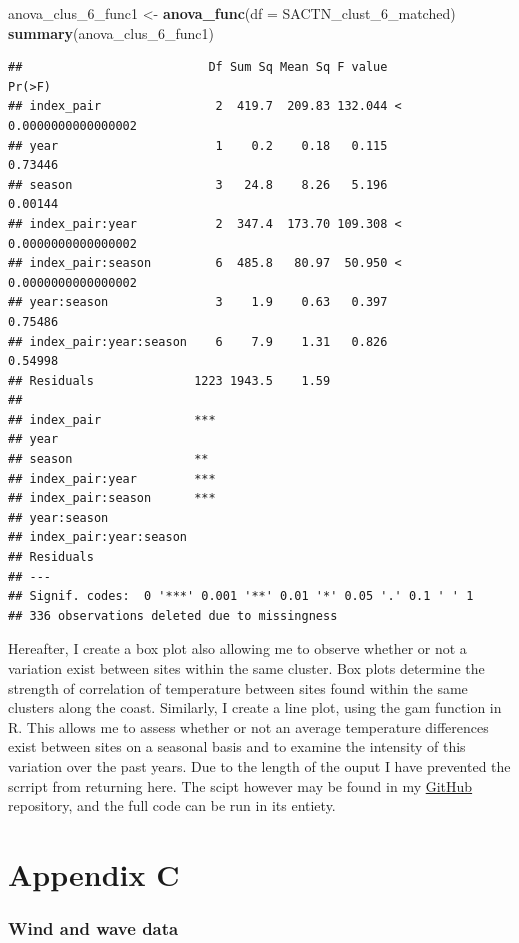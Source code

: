\documentclass[10pt,A4,]{article}
\newenvironment{Shaded}{\begin{snugshade}}{\end{snugshade}}
\newcommand{\KeywordTok}[1]{\textcolor[rgb]{0.13,0.29,0.53}{\textbf{#1}}}
\newcommand{\DataTypeTok}[1]{\textcolor[rgb]{0.13,0.29,0.53}{#1}}
\newcommand{\StringTok}[1]{\textcolor[rgb]{0.31,0.60,0.02}{#1}}
\newcommand{\NormalTok}[1]{#1}
\begin{document}
\begin{Shaded}
\begin{Highlighting}[]
\NormalTok{anova_clus_6_func1 <-}\StringTok{ }\KeywordTok{anova_func}\NormalTok{(}\DataTypeTok{df =}\NormalTok{ SACTN_clust_6_matched)}
\KeywordTok{summary}\NormalTok{(anova_clus_6_func1)}
\end{Highlighting}
\end{Shaded}

\begin{verbatim}
##                          Df Sum Sq Mean Sq F value               Pr(>F)
## index_pair                2  419.7  209.83 132.044 < 0.0000000000000002
## year                      1    0.2    0.18   0.115              0.73446
## season                    3   24.8    8.26   5.196              0.00144
## index_pair:year           2  347.4  173.70 109.308 < 0.0000000000000002
## index_pair:season         6  485.8   80.97  50.950 < 0.0000000000000002
## year:season               3    1.9    0.63   0.397              0.75486
## index_pair:year:season    6    7.9    1.31   0.826              0.54998
## Residuals              1223 1943.5    1.59                             
##                           
## index_pair             ***
## year                      
## season                 ** 
## index_pair:year        ***
## index_pair:season      ***
## year:season               
## index_pair:year:season    
## Residuals                 
## ---
## Signif. codes:  0 '***' 0.001 '**' 0.01 '*' 0.05 '.' 0.1 ' ' 1
## 336 observations deleted due to missingness
\end{verbatim}

Hereafter, I create a box plot also allowing me to observe whether or
not a variation exist between sites within the same cluster. Box plots
determine the strength of correlation of temperature between sites found
within the same clusters along the coast. Similarly, I create a line
plot, using the gam function in R. This allows me to assess whether or
not an average temperature differences exist between sites on a seasonal
basis and to examine the intensity of this variation over the past
years. Due to the length of the ouput I have prevented the scrript from
returning here. The scipt however may be found in my
\href{https://github.com/amierohabrahams/HONOURSPROJECT}{GitHub}
repository, and the full code can be run in its entiety.

\section*{\large{Appendix C}}\subsubsection*{Wind and wave data}
\end{document}
